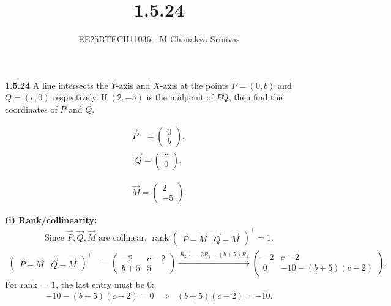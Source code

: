 \documentclass[journal]{IEEEtran}
\begin{document}
	
	
	\vspace{3cm}
	
	\title{1.5.24}
	\author{EE25BTECH11036 - M Chanakya Srinivas}
	\maketitle
	{\let\newpage\relax\maketitle}
	
	\renewcommand{\thefigure}{\theenumi}
	\renewcommand{\thetable}{\theenumi}
	\setlength{\intextsep}{10pt} %
	
	
\renewcommand\theequation{\arabic{equation}}
\renewcommand\thefigure{\arabic{figure}}
\renewcommand{\thetable}{\theenumi}

\textbf{1.5.24}\quad
A line intersects the $Y$-axis and $X$-axis at the points
$P=(0,b)$ and $Q=(c,0)$ respectively. If $(2,-5)$ is the midpoint of
$\overline{PQ}$, then find the coordinates of $P$ and $Q$.

\providecommand{\myvec}[1]{\begin{pmatrix}#1\end{pmatrix}}

\begin{align}
\vec P&=\myvec{0\\ b},
\end{align}
\begin{align}
    \vec Q=\myvec{c\\ 0},
\end{align} 

\begin{align}
\vec M=\myvec{2\\ -5}.
\end{align}

\textbf{(i) Rank/collinearity: } 
\begin{align}
\text{Since } \vec P,\vec Q,\vec M \text{ are collinear, } 
\operatorname{rank}\myvec{\vec P-\vec M & \vec Q-\vec M}^{\top}=1.
\end{align}
\begin{align}
\myvec{\vec P-\vec M & \vec Q-\vec M}^{\top}
&=\myvec{-2 & c-2\\[2pt] b+5 & 5}
\xrightarrow{\,R_2\leftarrow -2R_2-(b+5)R_1\,}
\myvec{-2 & c-2\\[2pt] 0 & -10-(b+5)(c-2)}.
\end{align}
For rank \(=1\), the last entry must be \(0\):
\begin{align}
\label{eq:theory}
-10-(b+5)(c-2)=0
\;\;\Longrightarrow\;\;
(b+5)(c-2)=-10.
\end{align}
\end{document}

